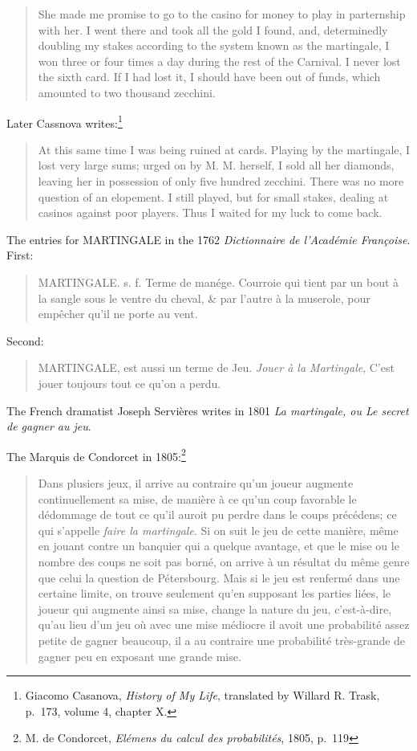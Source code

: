 \documentclass{article}
\theoremstyle{definition}
\begin{document}
\begin{quote}
She made me promise to go to the casino for money to play in parternship with her. I went there
and took all the gold I found, and, determinedly doubling my stakes according to the system known
as the martingale, I won three or four times a day during the rest of the Carnival.
I never lost the sixth card. If I had lost it, I should have been out of funds, which amounted
to two thousand zecchini.
\end{quote}

Later Cassnova writes:\footnote{Giacomo Casanova, {\em History of My Life},
translated by Willard R. Trask, p.~173, volume 4, chapter X.}

\begin{quote}
At this same time I was being ruined at cards. Playing by the martingale, I lost very large sums; urged
on by M. M. herself, I sold all her diamonds, leaving her in possession of only five hundred
zecchini. There was no more question of an elopement. I still played, but for small
stakes, dealing at casinos against poor players. Thus I waited for my luck to come back.
\end{quote}

The entries for MARTINGALE in the 1762 {\em Dictionnaire de l'Acad\'emie Fran\c{c}oise}. First:
\begin{quote}
MARTINGALE. s. f. Terme de man\'ege. Courroie qui tient par un bout \`a la sangle sous le ventre du cheval, \& 
par l'autre \`a la muserole, pour emp\^echer qu'il ne porte au vent.
\end{quote}
Second:
\begin{quote}
MARTINGALE, est aussi un terme de Jeu. {\em Jouer \`a la Martingale}, C'est jouer toujours tout ce 
qu'on a perdu.
\end{quote}

The French dramatist Joseph Servi\`eres writes in 1801 
{\em La martingale, ou Le secret de gagner au jeu}.

The Marquis de Condorcet in 1805:\footnote{M. de Condorcet, {\em El\'emens du calcul des probabilit\'es},
1805, p.~119}
\begin{quote}
Dans plusiers jeux, il arrive au contraire qu'un joueur augmente continuellement sa mise,
de mani\`ere \`a ce qu'un coup favorable le d\'edommage de tout ce qu'il auroit pu perdre dans le
coups pr\'ec\'edens; ce qui s'appelle {\em faire la martingale}. Si on suit le jeu de cette mani\`ere, m\^eme
en jouant contre un banquier qui a quelque avantage, et que le mise ou le nombre des coups
ne soit pas born\'e, on arrive \`a un r\'esultat du m\^eme genre que celui la question de P\'etersbourg. Mais
si le jeu est renferm\'e dans une certaine limite, on trouve seulement qu'en supposant les parties
li\'ees, le joueur qui augmente ainsi sa mise, change la nature du jeu, c'est-\`a-dire, qu'au 
lieu d'un jeu o\`u avec une mise m\'ediocre il avoit une probabilit\'e assez petite de gagner beaucoup,
il a au contraire une probabilit\'e tr\`es-grande de gagner peu en exposant une grande mise.
\end{quote}
\end{document}
